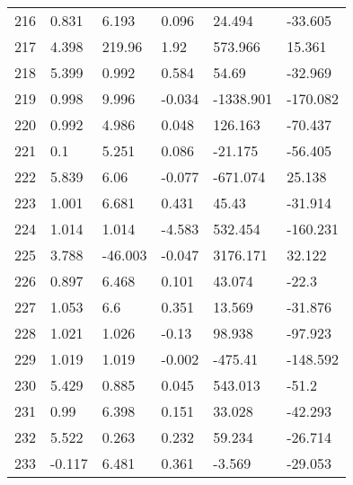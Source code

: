 \documentclass[11pt]{article}
\begin{document}
\begin{center}
\begin{longtable}{llllll}
        216 & 0.831      & 6.193                  & 0.096             & 24.494             & -33.605  \\
        217 & 4.398      & 219.96                 & 1.92              & 573.966            & 15.361   \\
        218 & 5.399      & 0.992                  & 0.584             & 54.69              & -32.969  \\
        219 & 0.998      & 9.996                  & -0.034            & -1338.901          & -170.082 \\
        220 & 0.992      & 4.986                  & 0.048             & 126.163            & -70.437  \\
        221 & 0.1        & 5.251                  & 0.086             & -21.175            & -56.405  \\
        222 & 5.839      & 6.06                   & -0.077            & -671.074           & 25.138   \\
        223 & 1.001      & 6.681                  & 0.431             & 45.43              & -31.914  \\
        224 & 1.014      & 1.014                  & -4.583            & 532.454            & -160.231 \\
        225 & 3.788      & -46.003                & -0.047            & 3176.171           & 32.122   \\
        226 & 0.897      & 6.468                  & 0.101             & 43.074             & -22.3    \\
        227 & 1.053      & 6.6                    & 0.351             & 13.569             & -31.876  \\
        228 & 1.021      & 1.026                  & -0.13             & 98.938             & -97.923  \\
        229 & 1.019      & 1.019                  & -0.002            & -475.41            & -148.592 \\
        230 & 5.429      & 0.885                  & 0.045             & 543.013            & -51.2    \\
        231 & 0.99       & 6.398                  & 0.151             & 33.028             & -42.293  \\
        232 & 5.522      & 0.263                  & 0.232             & 59.234             & -26.714  \\
        233 & -0.117     & 6.481                  & 0.361             & -3.569             & -29.053  \\

\end{longtable}
\end{center}
\end{document}

